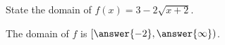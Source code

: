 \documentclass{ximera}
\author{Carl Stitz \and Jeff Zeager \and Bart Snapp \and Matthew Carr}
\begin{document}
\begin{exercise}



State the domain of $f(x)=3-2\sqrt{x+2}$.
\begin{center}
The domain of $f$ is $[\answer{-2},\answer{\infty})$.
\end{center}

\end{exercise}
\end{document}
